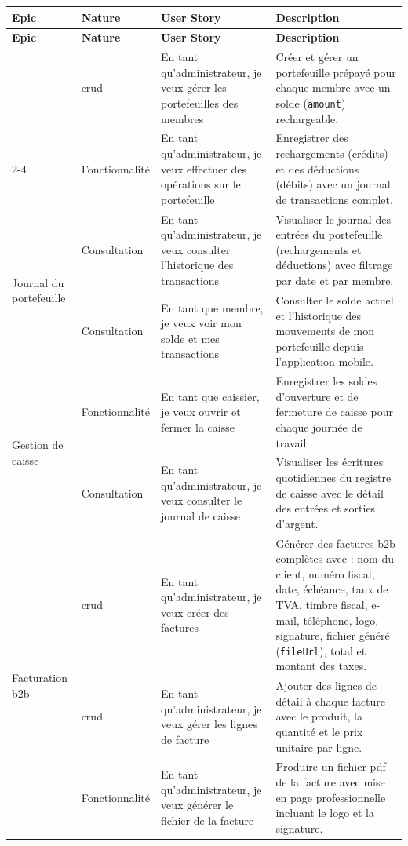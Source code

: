 ﻿\documentclass[../main.tex]{subfiles}
\begin{document}
\begin{longtable}{|p{2.5cm}|p{2cm}|p{4cm}|p{5.5cm}|}
\hline
\textbf{Epic} & \textbf{Nature} & \textbf{User Story} & \textbf{Description} \\
\hline
\endfirsthead
\hline
\textbf{Epic} & \textbf{Nature} & \textbf{User Story} & \textbf{Description} \\
\hline
\endhead
\hline
\endfoot

\multirow{2}{*}{\parbox{2.5cm}{Portefeuille pr\'{e}pay\'{e}}} & \acrshort{crud} & En tant qu'administrateur, je veux g\'{e}rer les portefeuilles des membres & Cr\'{e}er et g\'{e}rer un portefeuille pr\'{e}pay\'{e} pour chaque membre avec un solde (\texttt{amount}) rechargeable. \\
\cline{2-4}
 & Fonctionnalit\'{e} & En tant qu'administrateur, je veux effectuer des op\'{e}rations sur le portefeuille & Enregistrer des rechargements (cr\'{e}dits) et des d\'{e}ductions (d\'{e}bits) avec un journal de transactions complet. \\
\hline

\multirow{2}{*}{\parbox{2.5cm}{Journal du portefeuille}} & Consultation & En tant qu'administrateur, je veux consulter l'historique des transactions & Visualiser le journal des entr\'{e}es du portefeuille (rechargements et d\'{e}ductions) avec filtrage par date et par membre. \\
\cline{2-4}
 & Consultation & En tant que membre, je veux voir mon solde et mes transactions & Consulter le solde actuel et l'historique des mouvements de mon portefeuille depuis l'application mobile. \\
\hline

\multirow{2}{*}{\parbox{2.5cm}{Gestion de caisse}} & Fonctionnalit\'{e} & En tant que caissier, je veux ouvrir et fermer la caisse & Enregistrer les soldes d'ouverture et de fermeture de caisse pour chaque journ\'{e}e de travail. \\
\cline{2-4}
 & Consultation & En tant qu'administrateur, je veux consulter le journal de caisse & Visualiser les \'{e}critures quotidiennes du registre de caisse avec le d\'{e}tail des entr\'{e}es et sorties d'argent. \\
\hline

\multirow{3}{*}{\parbox{2.5cm}{Facturation \acrshort{b2b}}} & \acrshort{crud} & En tant qu'administrateur, je veux cr\'{e}er des factures & G\'{e}n\'{e}rer des factures \acrshort{b2b} compl\`{e}tes avec : nom du client, num\'{e}ro fiscal, date, \'{e}ch\'{e}ance, taux de TVA, timbre fiscal, e-mail, t\'{e}l\'{e}phone, logo, signature, fichier g\'{e}n\'{e}r\'{e} (\texttt{fileUrl}), total et montant des taxes. \\
\cline{2-4}
 & \acrshort{crud} & En tant qu'administrateur, je veux g\'{e}rer les lignes de facture & Ajouter des lignes de d\'{e}tail \`{a} chaque facture avec le produit, la quantit\'{e} et le prix unitaire par ligne. \\
\cline{2-4}
 & Fonctionnalit\'{e} & En tant qu'administrateur, je veux g\'{e}n\'{e}rer le fichier de la facture & Produire un fichier \acrshort{pdf} de la facture avec mise en page professionnelle incluant le logo et la signature. \\
\hline


\end{longtable}
\end{document}
